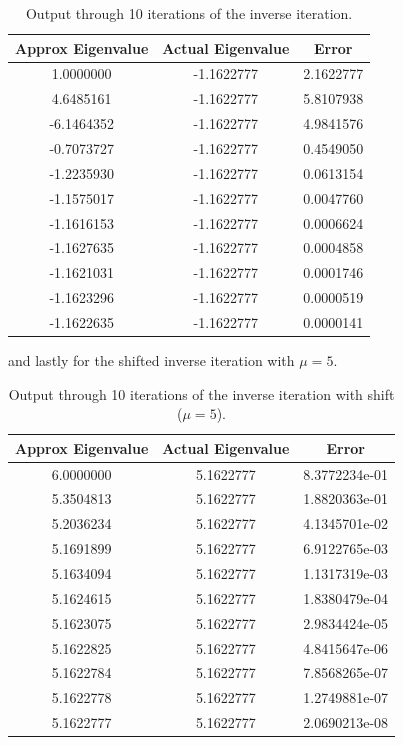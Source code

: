 \documentclass[12pt,
               a4paper,
               article,
               oneside,
               english,oldfontcommands]{memoir}
\begin{document}
\begin{table}[H] 
  \begin{center} 
    \label{tab: inv it}
    \begin{tabular}{c c c } 
      \textbf{Approx Eigenvalue}& \textbf{Actual Eigenvalue} & \textbf{Error}\\
      \hline 
        1.0000000   &      -1.1622777  &2.1622777\\
       4.6485161         &-1.1622777  &5.8107938\\
       -6.1464352         &-1.1622777  &4.9841576\\
       -0.7073727        & -1.1622777  &0.4549050\\
          -1.2235930        & -1.1622777  &0.0613154\\
          -1.1575017        & -1.1622777  &0.0047760\\
          -1.1616153         &-1.1622777  &0.0006624\\
          -1.1627635        & -1.1622777  &0.0004858\\
          -1.1621031         &-1.1622777  &0.0001746\\
          -1.1623296         &-1.1622777  &0.0000519\\
         -1.1622635         &-1.1622777  &0.0000141\\
      \hline
    \end{tabular}
     \caption{Output through 10 iterations of the inverse iteration.}
  \end{center}
\end{table}
and lastly for the shifted inverse iteration with $\mu = 5$. 
\begin{table}[H] 
  \begin{center} 
    \label{tab: inv shift}
    \begin{tabular}{c c c } 
      \textbf{Approx Eigenvalue}& \textbf{Actual Eigenvalue} & \textbf{Error}\\
      \hline 
           6.0000000     &     5.1622777 & 8.3772234e-01\\
          5.3504813        &  5.1622777 & 1.8820363e-01\\
           5.2036234       &   5.1622777  & 4.1345701e-02\\
           5.1691899         & 5.1622777  & 6.9122765e-03\\
           5.1634094        &  5.1622777 & 1.1317319e-03\\
           5.1624615         & 5.1622777  & 1.8380479e-04\\
           5.1623075         & 5.1622777 & 2.9834424e-05\\
           5.1622825        &  5.1622777 &  4.8415647e-06\\
           5.1622784          & 5.1622777 & 7.8568265e-07\\
           5.1622778         & 5.1622777 & 1.2749881e-07\\
          5.1622777          & 5.1622777 & 2.0690213e-08\\
      \hline
    \end{tabular}
     \caption{Output through 10 iterations of the inverse iteration with shift ($\mu = 5$).}
  \end{center}
\end{table}
\end{document}
